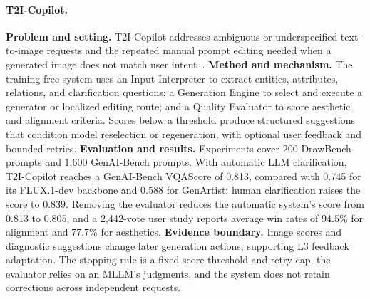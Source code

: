 \paragraph{T2I-Copilot.}
\textbf{Problem and setting.} T2I-Copilot addresses ambiguous or underspecified text-to-image requests and the repeated manual prompt editing needed when a generated image does not match user intent~\cite{chen2025t2icopilot}. \textbf{Method and mechanism.} The training-free system uses an Input Interpreter to extract entities, attributes, relations, and clarification questions; a Generation Engine to select and execute a generator or localized editing route; and a Quality Evaluator to score aesthetic and alignment criteria. Scores below a threshold produce structured suggestions that condition model reselection or regeneration, with optional user feedback and bounded retries. \textbf{Evaluation and results.} Experiments cover 200 DrawBench prompts and 1,600 GenAI-Bench prompts. With automatic LLM clarification, T2I-Copilot reaches a GenAI-Bench VQAScore of 0.813, compared with 0.745 for its FLUX.1-dev backbone and 0.588 for GenArtist; human clarification raises the score to 0.839. Removing the evaluator reduces the automatic system's score from 0.813 to 0.805, and a 2,442-vote user study reports average win rates of 94.5\% for alignment and 77.7\% for aesthetics. \textbf{Evidence boundary.} Image scores and diagnostic suggestions change later generation actions, supporting L3 feedback adaptation. The stopping rule is a fixed score threshold and retry cap, the evaluator relies on an MLLM's judgments, and the system does not retain corrections across independent requests.

